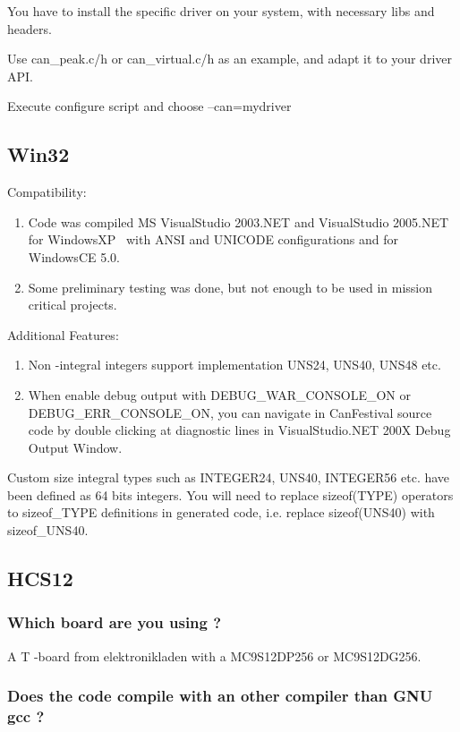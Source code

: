 \documentclass[12pt,english,a4paper]{book}
\begin{document}
You have to install the specific driver on your system, with necessary
libs and headers.

Use can\_peak.c/h or can\_virtual.c/h as an example, and adapt it
to your driver API.

Execute configure script and choose --can=mydriver


\subsection{Win32}

Compatibility:

\begin{enumerate}
\item Code was compiled MS VisualStudio 2003.NET and VisualStudio 2005.NET
for WindowsXP \ with ANSI and UNICODE configurations and for WindowsCE
5.0. 
\item Some preliminary testing was done, but not enough to be used in mission
critical projects. 
\end{enumerate}
Additional Features:

\begin{enumerate}
\item Non -integral integers support implementation UNS24, UNS40, UNS48
etc. 
\item When enable debug output with DEBUG\_WAR\_CONSOLE\_ON or DEBUG\_ERR\_CONSOLE\_ON,
you can navigate in CanFestival source code by double clicking at
diagnostic lines in VisualStudio.NET 200X Debug Output Window. 
\end{enumerate}
Custom size integral types such as INTEGER24, UNS40, INTEGER56 etc.
have been defined as 64 bits integers. You will need to replace sizeof(TYPE)
operators to sizeof\_TYPE definitions in generated code, i.e. replace
sizeof(UNS40) with sizeof\_UNS40.


\subsection{HCS12}


\subsubsection{Which board are you using ?}

A T -board from elektronikladen with a MC9S12DP256 or MC9S12DG256.


\subsubsection{Does the code compile with an other compiler than GNU gcc ?}
\end{document}
